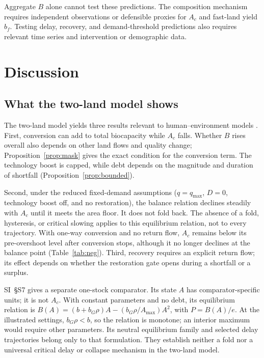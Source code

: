 \documentclass[preprint,12pt,authoryear]{elsarticle}
\begin{document}
\begin{samepage}
Aggregate $B$ alone cannot test these predictions. The composition mechanism requires independent observations or defensible proxies for $A_c$ and fast-land yield $b_f$. Testing delay, recovery, and demand-threshold predictions also requires relevant time series and intervention or demographic data.\par
\end{samepage}
\clearpage
\section{Discussion}\label{sec:discussion}

\subsection{What the two-land model shows}

The two-land model yields three results relevant to human--environment models \citep{Schaefer1954,May1973,Meadows1972,Meadows2004,WackernagelRees1996,BranderTaylor1998}. First, conversion can add to total biocapacity while $A_c$ falls. Whether $B$ rises overall also depends on other land flows and quality change; Proposition~\ref{prop:mask} gives the exact condition for the conversion term. The technology boost is capped, while debt depends on the magnitude and duration of shortfall (Proposition~\ref{prop:bounded}).

Second, under the reduced fixed-demand assumptions ($q=q_{\max}$, $D=0$, technology boost off, and no restoration), the balance relation declines steadily with $A_c$ until it meets the area floor. It does not fold back. The absence of a fold, hysteresis, or critical slowing applies to this equilibrium relation, not to every trajectory. With one-way conversion and no return flow, $A_c$ remains below its pre-overshoot level after conversion stops, although it no longer declines at the balance point (Table~\ref{tab:neg}). Third, recovery requires an explicit return flow; its effect depends on whether the restoration gate opens during a shortfall or a surplus.

SI~\S S7 gives a separate one-stock comparator. Its state $A$ has comparator-specific units; it is not $A_c$. With constant parameters and no debt, its equilibrium relation is $B(A)=(b+b_G\rho)A-(b_G\rho/A_{\max})A^2$, with $P=B(A)/e$. At the illustrated settings, $b_G\rho<b$, so the relation is monotone; an interior maximum would require other parameters. Its neutral equilibrium family and selected delay trajectories belong only to that formulation. They establish neither a fold nor a universal critical delay or collapse mechanism in the two-land model.
\end{document}
